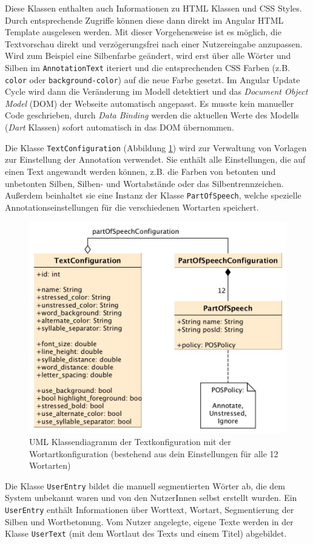 Diese Klassen enthalten auch Informationen zu HTML Klassen und CSS Styles. Durch entsprechende Zugriffe können diese dann direkt im Angular HTML Template ausgelesen werden. Mit dieser Vorgehensweise ist es möglich, die Textvorschau direkt und verzögerungsfrei nach einer Nutzereingabe anzupassen. Wird zum Beispiel eine Silbenfarbe geändert, wird erst über alle Wörter und Silben im \texttt{AnnotationText} iteriert und die entsprechenden CSS Farben (z.B. \texttt{color} oder \texttt{background-color}) auf die neue Farbe gesetzt. Im Angular Update Cycle wird dann die Veränderung im Modell detektiert und das \textit{Document Object Model} (DOM) der Webseite automatisch angepasst. Es musste kein manueller Code geschrieben, durch \textit{Data Binding} werden die aktuellen Werte des Modells (\textit{Dart} Klassen) sofort automatisch in das DOM übernommen.

Die Klasse \texttt{TextConfiguration} (Abbildung \ref{fig:textconf}) wird zur Verwaltung von Vorlagen zur Einstellung der Annotation verwendet. Sie enthält alle Einstellungen, die auf einen Text angewandt werden können, z.B. die Farben von betonten und unbetonten Silben, Silben- und Wortabstände oder das Silbentrennzeichen. Außerdem beinhaltet sie eine Instanz der Klasse \texttt{PartOfSpeech}, welche spezielle Annotationseinstellungen für die verschiedenen Wortarten speichert.

\begin{figure}[h!]
	\centering
	\includegraphics[width=.5\linewidth]{figures/frontend/uml-textconfig}
	\caption{UML Klassendiagramm der Textkonfiguration mit der Wortartkonfiguration (bestehend aus dein Einstellungen für alle 12 Wortarten)}
	\label{fig:textconf}
\end{figure}

Die Klasse \texttt{UserEntry} bildet die manuell segmentierten Wörter ab, die dem System unbekannt waren und von den NutzerInnen selbst erstellt wurden. Ein \texttt{UserEntry} enthält Informationen über Worttext, Wortart, Segmentierung der Silben und Wortbetonung. Vom Nutzer angelegte, eigene Texte werden in der Klasse \texttt{UserText} (mit dem Wortlaut des Texts und einem Titel) abgebildet.


